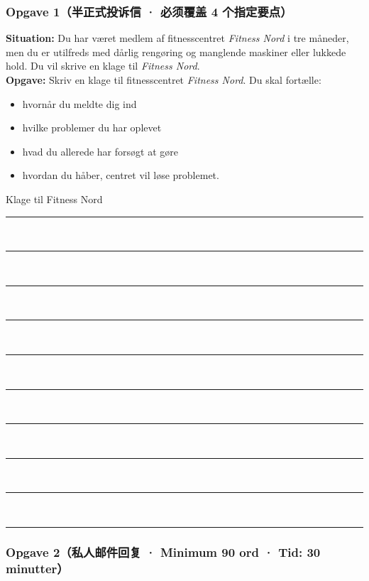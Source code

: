 
\subsubsection*{Opgave 1（半正式投诉信 · 必须覆盖 4 个指定要点）}

\textbf{Situation:} Du har været medlem af fitnesscentret \textit{Fitness Nord} i tre måneder, men du er utilfreds med dårlig rengøring og manglende maskiner eller lukkede hold. Du vil skrive en klage til \textit{Fitness Nord}.\\[2pt]
\textbf{Opgave:} Skriv en klage til fitnesscentret \textit{Fitness Nord}. Du skal fortælle:
\begin{itemize}
  \item hvornår du meldte dig ind
  \item hvilke problemer du har oplevet
  \item hvad du allerede har forsøgt at gøre
  \item hvordan du håber, centret vil løse problemet.
\end{itemize}

\begin{emailbox}{Klage til Fitness Nord}
\vspace{0.3em}
\rule{\linewidth}{0.4pt}\\[0.55em]
\rule{\linewidth}{0.4pt}\\[0.55em]
\rule{\linewidth}{0.4pt}\\[0.55em]
\rule{\linewidth}{0.4pt}\\[0.55em]
\rule{\linewidth}{0.4pt}\\[0.55em]
\rule{\linewidth}{0.4pt}\\[0.55em]
\rule{\linewidth}{0.4pt}\\[0.55em]
\rule{\linewidth}{0.4pt}\\[0.55em]
\rule{\linewidth}{0.4pt}\\[0.55em]
\rule{\linewidth}{0.4pt}
\end{emailbox}

\subsubsection*{Opgave 2（私人邮件回复 · Minimum 90 ord · Tid: 30 minutter）}

